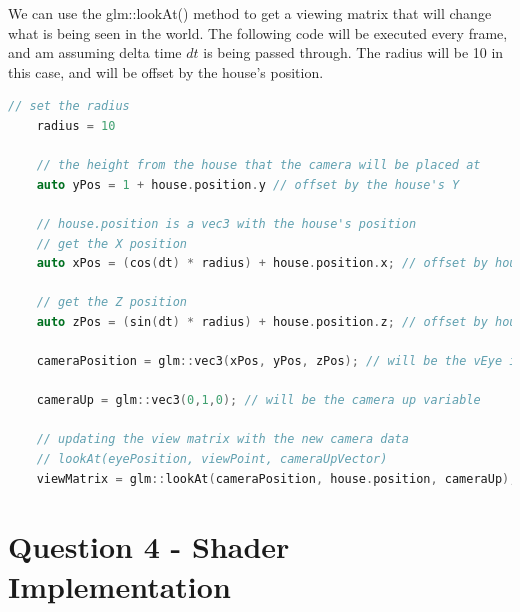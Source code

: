 \documentclass[10pt]{report}
\begin{document}
We can use the glm::lookAt() method to get a viewing matrix that will change what is being seen in the world. The following code will be executed every frame, and am assuming delta time \(dt\) is being passed through. The radius will be 10 in this case, and will be offset by the house's position.

\begin{lstlisting}[language = c]
    // set the radius
    radius = 10

    // the height from the house that the camera will be placed at
    auto yPos = 1 + house.position.y // offset by the house's Y

    // house.position is a vec3 with the house's position
    // get the X position 
    auto xPos = (cos(dt) * radius) + house.position.x; // offset by house's X

    // get the Z position
    auto zPos = (sin(dt) * radius) + house.position.z; // offset by house's Z

    cameraPosition = glm::vec3(xPos, yPos, zPos); // will be the vEye in the lookAt

    cameraUp = glm::vec3(0,1,0); // will be the camera up variable

    // updating the view matrix with the new camera data
    // lookAt(eyePosition, viewPoint, cameraUpVector)
    viewMatrix = glm::lookAt(cameraPosition, house.position, cameraUp);

\end{lstlisting}


\chapter{Question 4 - Shader Implementation}
\end{document}
